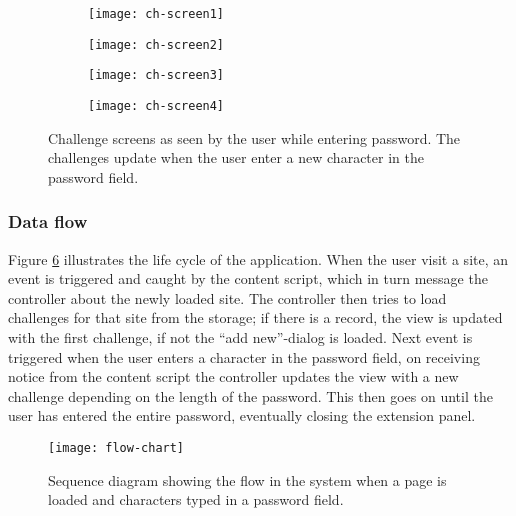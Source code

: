 \begin{figure}
    \centering
    \begin{subfigure}[t]{0.45\textwidth}
        \centering
        \texttt{[image: ch-screen1]} 
        \caption{}
        \label{challenge-screen1}
    \end{subfigure}
    \hfill
    \begin{subfigure}[t]{0.45\textwidth}
        \centering
        \texttt{[image: ch-screen2]} 
        \caption{}
        \label{challenge-screen2}
    \end{subfigure}
    \hfill
    \begin{subfigure}[t]{0.45\textwidth}
        \centering
        \texttt{[image: ch-screen3]} 
        \caption{}
        \label{challenge-screen3}
    \end{subfigure}
    \hfill
    \begin{subfigure}[t]{0.45\textwidth}
        \centering
        \texttt{[image: ch-screen4]} 
        \caption{}
        \label{challenge-screen4}
    \end{subfigure}
    \caption{Challenge screens as seen by the user while entering password. The challenges update when the user enter a new character in the password field.}
    \label{ch-screens}
\end{figure}


\newpage

\subsubsection{Data flow}\label{data-flow}
Figure \ref{flow-chart} illustrates the life cycle of the application. When the user visit a site, an event is triggered and caught by the content script, which in turn message the controller about the newly loaded site. The controller then tries to load challenges for that site from the storage; if there is a record, the view is updated with the first challenge, if not the ``add new''-dialog is loaded. Next event is triggered when the user enters a character in the password field, on receiving notice from the content script the controller updates the view with a new challenge depending on the length of the password. This then goes on until the user has entered the entire password, eventually closing the extension panel.
\begin{figure}
    \centering
    \texttt{[image: flow-chart]} 
    \caption{Sequence diagram showing the flow in the system when a page is loaded and characters typed in a password field.}
    \label{flow-chart}
\end{figure}


